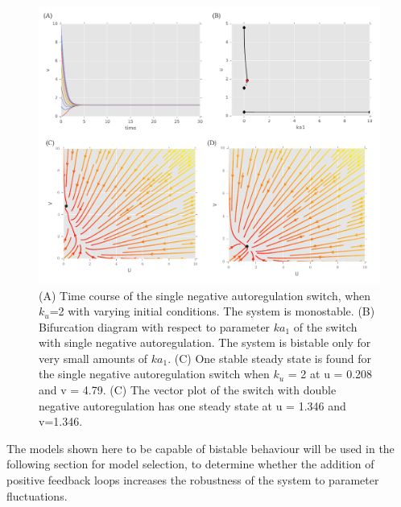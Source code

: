 \begin{figure}[htbp]
\centerfloat
\includegraphics[scale=0.7]{../../chapters/chapterABCSysBio/images/gard_neg.pdf}
\caption[Phase plane and bifurcation analysis of the switch with negative autoregulation]{\label{fig:Gard_neg}(A) Time course of the single negative autoregulation switch, when $k_u$=2 with varying initial conditions. The system is monostable. (B) Bifurcation diagram with respect to parameter $ka_1$ of the switch with single negative autoregulation. The system is bistable only for very small amounts of $ka_1$. (C) One stable steady state is found for the single negative autoregulation switch when $k_u$ = 2 at u = 0.208 and v = 4.79. (C) The vector plot of the switch with double negative autoregulation has one steady state at u = 1.346 and v=1.346.}

\end{figure}
\clearpage

The models shown here to be capable of bistable behaviour will be used in the following section for model selection, to determine whether the addition of positive feedback loops increases the robustness of the system to parameter fluctuations.



